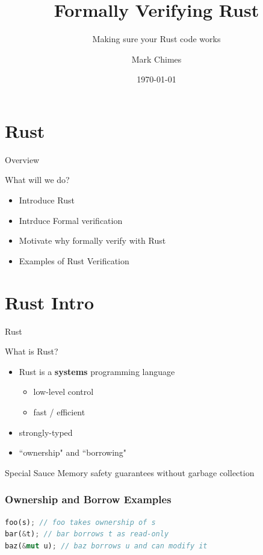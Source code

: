 \documentclass{beamer}
\title{Formally Verifying Rust}
\subtitle{Making sure your Rust code works}
\author{Mark Chimes}
\date{\today}
\begin{document}
\begin{frame}
    \titlepage
\end{frame}
%

\section{Rust}
\begin{frame}{Overview}
\begin{block}{What will we do?}
\begin{itemize} 
	\item Introduce Rust
	\item Intrduce Formal verification
	\item Motivate why formally verify with Rust
	\item Examples of Rust Verification
\end{itemize}
\end{block}
\end{frame}


\section{Rust Intro}
\begin{frame}{Rust}
\begin{block}{What is Rust?}
\begin{itemize}
	\item Rust is a \textbf{systems} programming language
	\begin{itemize}
		\item low-level control
		\item fast / efficient
	\end{itemize}
	\item strongly-typed
	\item ``ownership" and ``borrowing"
\end{itemize}
\end{block}
\begin{block}{Special Sauce} 
Memory safety guarantees without garbage collection
\end{block}
\end{frame}


\begin{frame}[fragile]
\frametitle{Ownership and Borrow Examples}
\begin{lstlisting}[language=Rust]
foo(s); // foo takes ownership of s
bar(&t); // bar borrows t as read-only
baz(&mut u); // baz borrows u and can modify it
\end{lstlisting}
\end{frame}
\end{document}
